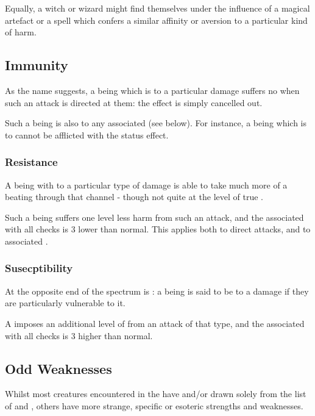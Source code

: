 Equally, a witch or wizard might find themselves under the influence of a magical artefact or a spell which confers a similar affinity or aversion to a particular kind of harm. 

\subsection{Immunity}

As the name suggests, a being which is  to a particular damage  suffers no  when such an attack is directed at them: the effect is simply cancelled out. 

Such a being is also  to any associated  (see below). For instance, a being which is  to  cannot be afflicted with the  status effect. 

\subsubsection{Resistance}

A being with  to a particular type of damage is able to take much more of a beating through that channel - though not quite at the level of true . 

Such a being suffers one level less harm from such an attack, and the  associated with all  checks is 3 lower than normal. This applies both to direct attacks, and to associated . 

\subsubsection{Susecptibility}

At the opposite end of the spectrum is : a being is said to be  to a damage  if they are particularly vulnerable to it. 

A  imposes an additional level of  from an attack of that type, and the  associated with all  checks is 3 higher than normal.


\subsection{Odd Weaknesses}

Whilst most creatures encountered in the  have  and/or  drawn solely from the list of  and , others have more strange, specific or esoteric strengths and weaknesses. 


